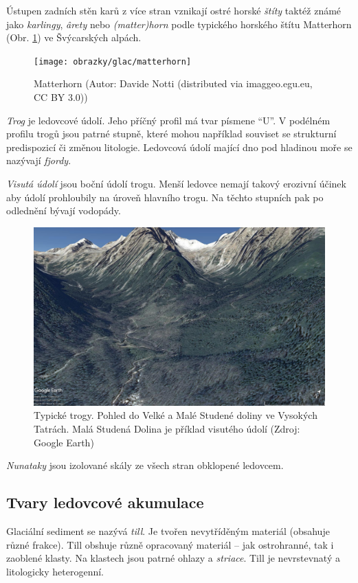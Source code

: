 Ústupen zadních stěn karů z více stran vznikají ostré horské \emph{štíty} taktéž známé jako \emph{karlingy}, \emph{\^{a}rety} nebo \emph{(matter)horn} podle typického horského štítu Matterhorn (Obr. \ref{fig:matterhorn}) ve Švýcarských alpách.

\begin{figure}
	\centering
	\texttt{[image: obrazky/glac/matterhorn]}
	\caption{Matterhorn (Autor: Davide Notti (distributed via imaggeo.egu.eu, CC BY 3.0))}
	\label{fig:matterhorn}
\end{figure}

\emph{Trog} je ledovcové údolí. Jeho příčný profil má tvar písmene \enquote{U}. V podélném profilu trogů jsou patrné stupně, které mohou například souviset se strukturní predispozicí či změnou litologie. Ledovcová údolí mající dno pod hladinou moře se nazývají \emph{fjordy}.

\emph{Visutá údolí} jsou boční údolí trogu. Menší ledovce nemají takový erozivní účinek aby údolí prohloubily na úroveň hlavního trogu. Na těchto stupních pak po odlednění bývají vodopády.

\begin{figure}
	\centering
	\includegraphics[width=1\linewidth]{obrazky/glac/studena}
	\caption{Typické trogy. Pohled do Velké a Malé Studené doliny ve Vysokých Tatrách. Malá Studená Dolina je příklad visutého údolí (Zdroj: Google Earth)}
	\label{fig:studena}
\end{figure}

\emph{Nunataky} jsou izolované skály ze všech stran obklopené ledovcem.

\subsection{Tvary ledovcové akumulace}
Glaciální sediment se nazývá \emph{till}. Je tvořen nevytříděným materiál (obsahuje různé frakce). Till obshuje různě opracovaný materiál -- jak ostrohranné, tak i zaoblené klasty. Na klastech jsou patrné ohlazy a \emph{striace}. Till je nevrstevnatý a litologicky heterogenní.

